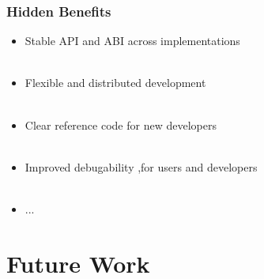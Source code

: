 \documentclass{beamer}
\begin{document}

\begin{frame}
\begin{center}
\frametitle{Hidden Benefits}

\begin{itemize}

\item Stable API and ABI across implementations\\

~\\

\item Flexible and distributed development\\

~\\

\item Clear reference code for new developers\\

~\\

\item Improved debugability ,for users and developers\\

~\\

\item ...

\end{itemize}

\end{center}
\end{frame}

\section{Future Work}
\end{document}
